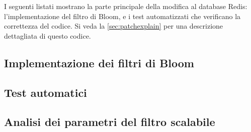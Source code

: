 I seguenti listati mostrano la parte principale della modifica al database Redis:
l'implementazione del filtro di Bloom, e i test automatizzati che verificano la correttezza
del codice. Si veda la \autoref{sec:patchexplain} per una descrizione dettagliata di questo codice.

\subsection{Implementazione dei filtri di Bloom}

\subsection{Test automatici}
\label{sec:code:test}

\subsection{Analisi dei parametri del filtro scalabile}
